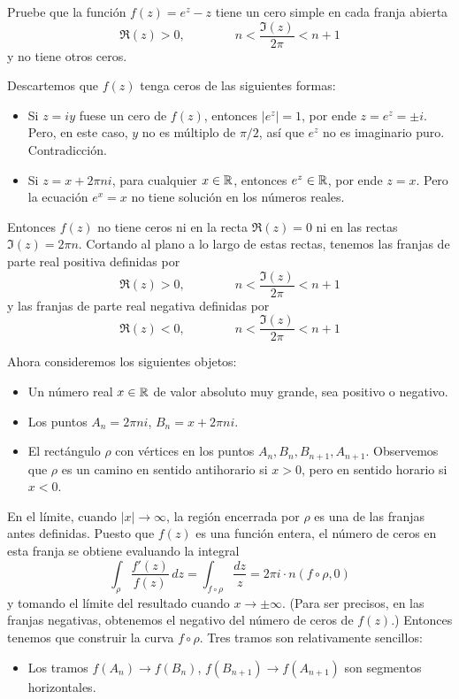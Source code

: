 \begin{exercise}
Pruebe que la función $f(z) = e^z - z$ tiene un cero simple en cada franja abierta
$$\Re(z) > 0, \qquad \qquad n < \frac {\Im(z)} {2\pi} < n+1$$
y no tiene otros ceros.
\end{exercise}

\begin{solution}
Descartemos que $f(z)$ tenga ceros de las siguientes formas:
\begin{itemize}
    \item Si $z = iy$ fuese un cero de $f(z)$, entonces $|e^z| = 1$, por ende $z = e^z = \pm i$. Pero, en este caso, $y$ no es múltiplo de $\pi/2$, así que $e^z$ no es imaginario puro. Contradicción.
    
    \item Si $z = x + 2\pi ni$, para cualquier $x \in \mathbb R$, entonces $e^z \in \mathbb R$, por ende $z = x$. Pero la ecuación $e^x = x$ no tiene solución en los números reales.
\end{itemize}
Entonces $f(z)$ no tiene ceros ni en la recta $\Re(z) = 0$ ni en las rectas $\Im(z) = 2\pi n$. Cortando al plano a lo largo de estas rectas, tenemos las franjas de parte real positiva definidas por
$$\Re(z) > 0, \qquad \qquad n < \frac {\Im(z)} {2\pi} < n+1$$
y las franjas de parte real negativa definidas por
$$\Re(z) < 0, \qquad \qquad n < \frac {\Im(z)} {2\pi} < n+1$$

\newpage

\noindent Ahora consideremos los siguientes objetos:
\begin{itemize}
    \item Un número real $x \in \mathbb R$ de valor absoluto muy grande, sea positivo o negativo.
    \item Los puntos $A_n = 2\pi ni$, $B_n = x + 2\pi ni$.
    \item El rectángulo $\rho$ con vértices en los puntos $A_n, B_n, B_{n+1}, A_{n+1}$. Observemos que $\rho$ es un camino en sentido antihorario si $x > 0$, pero en sentido horario si $x < 0$.
\end{itemize}
En el límite, cuando $|x| \to \infty$, la región encerrada por $\rho$ es una de las franjas antes definidas. Puesto que $f(z)$ es una función entera, el número de ceros en esta franja se obtiene evaluando la integral
$$
\int_\rho \frac {f'(z)} {f(z)} \, dz
    = \int_{f \circ \rho} \frac {dz} z
    = 2\pi i \cdot n(f \circ \rho, 0)
$$
y tomando el límite del resultado cuando $x \to \pm \infty$. (Para ser precisos, en las franjas negativas, obtenemos el negativo del número de ceros de $f(z)$.) Entonces tenemos que construir la curva $f \circ \rho$. Tres tramos son relativamente sencillos:
\begin{itemize}
    \item Los tramos $f(A_n) \to f(B_n)$, $f(B_{n+1}) \to f(A_{n+1})$ son segmentos horizontales.
    

\end{itemize}
\end{solution}
